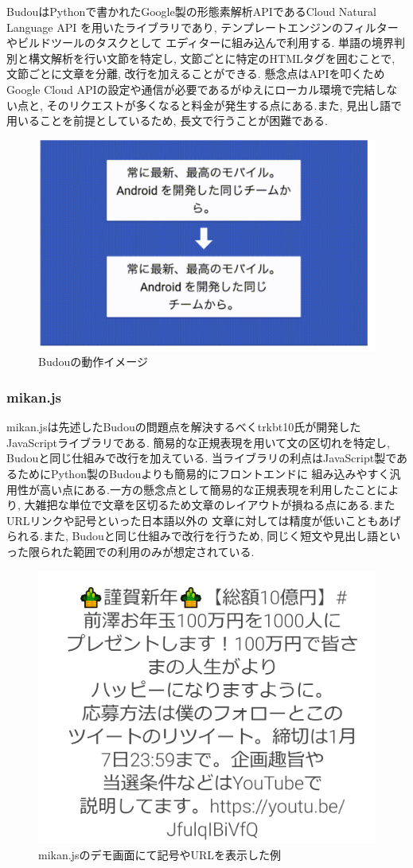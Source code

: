 BudouはPythonで書かれたGoogle製の形態素解析APIであるCloud Natural Language API
を用いたライブラリであり, テンプレートエンジンのフィルターやビルドツールのタスクとして
エディターに組み込んで利用する.
単語の境界判別と構文解析を行い文節を特定し, 文節ごとに特定のHTMLタグを囲むことで, 
文節ごとに文章を分離, 改行を加えることができる.
懸念点はAPIを叩くためGoogle Cloud APIの設定や通信が必要であるがゆえにローカル環境で完結しない点と, 
そのリクエストが多くなると料金が発生する点にある.また, 見出し語で用いることを前提としているため, 
長文で行うことが困難である.

\begin{figure}[H]
    \centering
    \label{fig:image7}
    \includegraphics[width=0.6\columnwidth]{image/02/img2.png}
    \caption[Budouの動作イメージ] {Budouの動作イメージ\footnotemark[3]}
\end{figure}

\subsubsection{mikan.js}

mikan.jsは先述したBudouの問題点を解決するべくtrkbt10氏が開発したJavaScriptライブラリである.
簡易的な正規表現を用いて文の区切れを特定し, Budouと同じ仕組みで改行を加えている.
当ライブラリの利点はJavaScript製であるためにPython製のBudouよりも簡易的にフロントエンドに
組み込みやすく汎用性が高い点にある.一方の懸念点として簡易的な正規表現を利用したことにより, 
大雑把な単位で文章を区切るため文章のレイアウトが損ねる点にある.またURLリンクや記号といった日本語以外の
文章に対しては精度が低いこともあげられる.また, Budouと同じ仕組みで改行を行うため, 
同じく短文や見出し語といった限られた範囲での利用のみが想定されている.

\begin{figure}[H]
    \centering
    \label{fig:image8}
    \includegraphics[width=0.6\columnwidth]{image/02/img3.png}
    \caption[mikan.jsのデモ画面にて記号やURLを表示した例]{mikan.jsのデモ画面にて記号やURLを表示した例\footnotemark[4]}
\end{figure}

